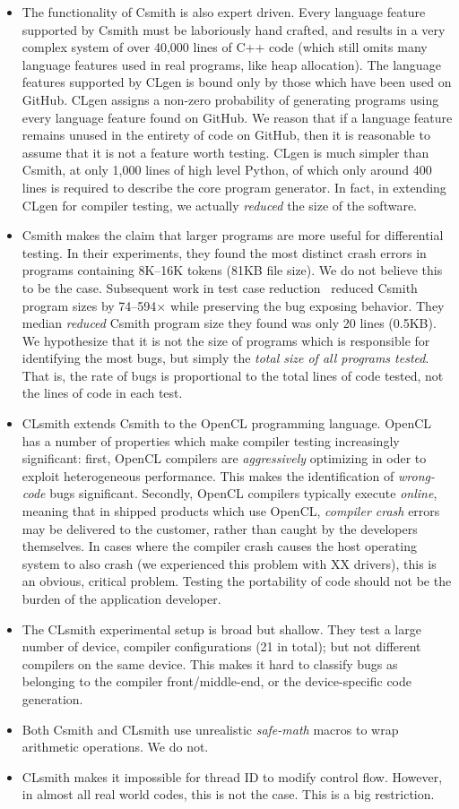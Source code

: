 \begin{itemize}
	\item The functionality of Csmith is also expert driven. Every language feature supported by Csmith must be laboriously hand crafted, and results in a very complex system of over 40,000 lines of C++ code (which still omits many language features used in real programs, like heap allocation). The language features supported by CLgen is bound only by those which have been used on GitHub. CLgen assigns a non-zero probability of generating programs using every language feature found on GitHub. We reason that if a language feature remains unused in the entirety of code on GitHub, then it is reasonable to assume that it is not a feature worth testing. CLgen is much simpler than Csmith, at only 1,000 lines of high level Python, of which only around 400 lines is required to describe the core program generator. In fact, in extending CLgen for compiler testing, we actually \emph{reduced} the size of the software.
	\item Csmith makes the claim that larger programs are more useful for differential testing. In their experiments, they found the most distinct crash errors in programs containing 8K--16K tokens (81KB file size). We do not believe this to be the case. Subsequent work in test case reduction~\cite{Regehr2012a} reduced Csmith program sizes by 74--594$\times$ while preserving the bug exposing behavior. They median \emph{reduced} Csmith program size they found was only 20 lines (0.5KB). We hypothesize that it is not the size of programs which is responsible for identifying the most bugs, but simply the \emph{total size of all programs tested}. That is, the rate of bugs is proportional to the total lines of code tested, not the lines of code in each test.
	\item CLsmith extends Csmith to the OpenCL programming language. OpenCL has a number of properties which make compiler testing increasingly significant: first, OpenCL compilers are \emph{aggressively} optimizing in oder to exploit heterogeneous performance. This makes the identification of \emph{wrong-code} bugs significant. Secondly, OpenCL compilers typically execute \emph{online}, meaning that in shipped products which use OpenCL, \emph{compiler crash} errors may be delivered to the customer, rather than caught by the developers themselves. In cases where the compiler crash causes the host operating system to also crash (we experienced this problem with XX drivers), this is an obvious, critical problem. Testing the portability of code should not be the burden of the application developer.
	\item The CLsmith experimental setup is broad but shallow. They test a large number of device, compiler configurations (21 in total); but not different compilers on the same device. This makes it hard to classify bugs as belonging to the compiler front/middle-end, or the device-specific code generation.
	\item Both Csmith and CLsmith use unrealistic \emph{safe-math} macros to wrap arithmetic operations. We do not.
	\item CLsmith makes it impossible for thread ID to modify control flow. However, in almost all real world codes, this is not the case. This is a big restriction.
\end{itemize}
